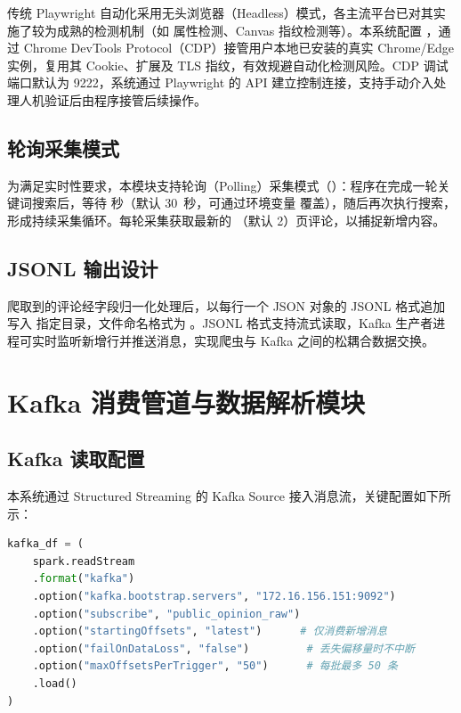 传统 Playwright 自动化采用无头浏览器（Headless）模式，各主流平台已对其实施了较为成熟的检测机制（如  属性检测、Canvas 指纹检测等）。本系统配置 ，通过 Chrome DevTools Protocol（CDP）接管用户本地已安装的真实 Chrome/Edge 实例，复用其 Cookie、扩展及 TLS 指纹，有效规避自动化检测风险。CDP 调试端口默认为 9222，系统通过 Playwright 的  API 建立控制连接，支持手动介入处理人机验证后由程序接管后续操作。

\subsection{轮询采集模式}

为满足实时性要求，本模块支持轮询（Polling）采集模式（）：程序在完成一轮关键词搜索后，等待  秒（默认 30~秒，可通过环境变量  覆盖），随后再次执行搜索，形成持续采集循环。每轮采集获取最新的 （默认 2）页评论，以捕捉新增内容。

\subsection{JSONL 输出设计}

爬取到的评论经字段归一化处理后，以每行一个 JSON 对象的 JSONL 格式追加写入  指定目录，文件命名格式为 。JSONL 格式支持流式读取，Kafka 生产者进程可实时监听新增行并推送消息，实现爬虫与 Kafka 之间的松耦合数据交换。

\section{Kafka 消费管道与数据解析模块}

\subsection{Kafka 读取配置}

本系统通过 Structured Streaming 的 Kafka Source 接入消息流，关键配置如下所示：

\begin{lstlisting}[language=Python, caption={Kafka Source 关键配置}, label={lst:kafka}]
kafka_df = (
    spark.readStream
    .format("kafka")
    .option("kafka.bootstrap.servers", "172.16.156.151:9092")
    .option("subscribe", "public_opinion_raw")
    .option("startingOffsets", "latest")      # 仅消费新增消息
    .option("failOnDataLoss", "false")         # 丢失偏移量时不中断
    .option("maxOffsetsPerTrigger", "50")      # 每批最多 50 条
    .load()
)
\end{lstlisting}

